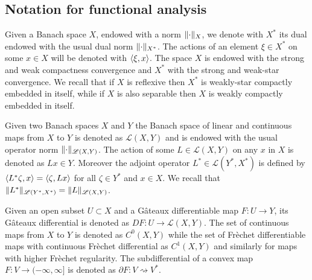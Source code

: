 \documentclass[a4paper,10pt,twoside]{amsbook}
\numberwithin{section}{chapter}
\numberwithin{equation}{chapter}
\theoremstyle{definition}
\DeclarePairedDelimiter{\norm}{\lVert}{\rVert}
\DeclarePairedDelimiter{\dual}{\langle}{\rangle}
\begin{document}
\subsection*{Notation for functional analysis}

Given a Banach space $X$, endowed with a norm $\norm{\cdot}_X$, we denote with $X^*$ its dual endowed with the usual dual norm $\norm{\cdot}_{X^*}$. The actions of an element $\xi\in X^*$ on some $x\in X$ will be denoted with $\dual{\xi,x}$. The space $X$ is endowed with the strong and weak compactness convergence and $X^*$ with the strong and weak-star convergence. We recall that if $X$ is reflexive then $X^*$ is weakly-star compactly embedded in itself, while if $X$ is also separable then $X$ is weakly compactly embedded in itself.

Given two Banach spaces $X$ and $Y$ the Banach space of linear and continuous maps from $X$ to $Y$ is denoted as $\mathscr{L}(X,Y)$ and is endowed with the usual operator norm $\norm{\cdot}_{\mathscr{L}(X,Y)}$. The action of some $L\in\mathscr{L}(X,Y)$ on any $x$ in $X$ is denoted as $Lx\in Y$. Moreover the adjoint operator $L^*\in\mathscr{L}(Y^*,X^*)$ is defined by $\dual{L^*\zeta,x}=\dual{\zeta,Lx}$ for all $\zeta\in Y^*$ and $x\in X$. We recall that $\norm{L^*}_{\mathscr{L}(Y^*,X^*)}=\norm{L}_{\mathscr{L}(X,Y)}$.

 Given an open subset $U\subset X$ and a G\^ateaux differentiable map $F\colon U\to Y$, its G\^ateaux differential is denoted as $DF\colon U\to\mathscr{L}(X,Y)$. The set of continuous maps from $X$ to $Y$ is denoted as $C^0(X,Y)$ while the set of Frèchet differentiable maps with continuous Frèchet differential as $C^1(X,Y)$ and similarly for maps with higher Frèchet regularity. The subdifferential of a convex map $F\colon V\to(-\infty,\infty]$ is denoted as $\partial F\colon V\rightsquigarrow V^*$.
\end{document}
